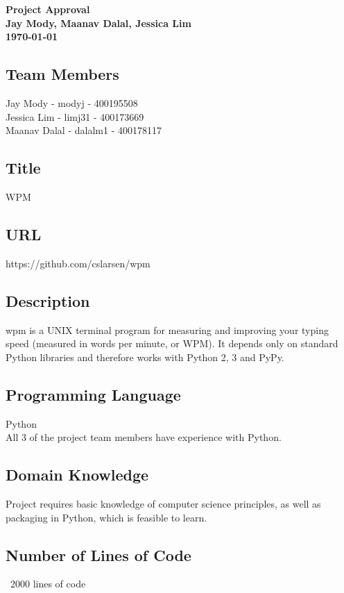 \documentclass{article}
\begin{document}
\begin{center}
    {\huge \textbf{Project Approval}}\\[2mm]
    {\large \textbf{Jay Mody, Maanav Dalal, Jessica Lim}}\\[2mm]
    {\large \textbf{\today}}\\[2mm]
\end{center}
\medskip

\subsection*{Team Members}

Jay Mody - modyj - 400195508\\
Jessica Lim - limj31 - 400173669\\
Maanav Dalal - dalalm1 - 400178117

\subsection*{Title}
WPM

\subsection*{URL}
https://github.com/cslarsen/wpm

\subsection*{Description}
wpm is a UNIX terminal program for measuring and improving your typing speed (measured in words per minute, or WPM).
It depends only on standard Python libraries and therefore works with Python 2, 3 and PyPy.

\subsection*{Programming Language}
Python\\
All 3 of the project team members have experience with Python.

\subsection*{Domain Knowledge}
Project requires basic knowledge of computer science principles, as well as packaging in Python, which is feasible to learn.

\subsection*{Number of Lines of Code}
~2000 lines of code
\end{document}
